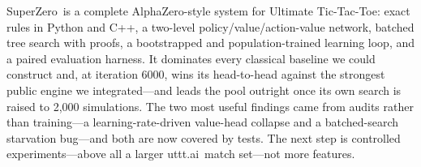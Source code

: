 \documentclass[conference]{IEEEtran}
\newcommand{\utttai}{uttt.ai}
\newcommand{\sys}{SuperZero}   %
\begin{document}
\sys\ is a complete AlphaZero-style system for Ultimate Tic-Tac-Toe: exact
rules in Python and C++, a two-level policy/value/action-value network,
batched tree search with proofs, a bootstrapped and population-trained
learning loop, and a paired evaluation harness. It dominates every
classical baseline we could construct and, at iteration 6000, wins its
head-to-head against the strongest public engine we integrated---and leads
the pool outright once its own search is raised to 2{,}000 simulations. The two most useful
findings came from audits rather than training---a learning-rate-driven
value-head collapse and a batched-search starvation bug---and both are now
covered by tests. The next step is controlled experiments---above all a
larger \utttai\ match set---not more features.



\end{document}
